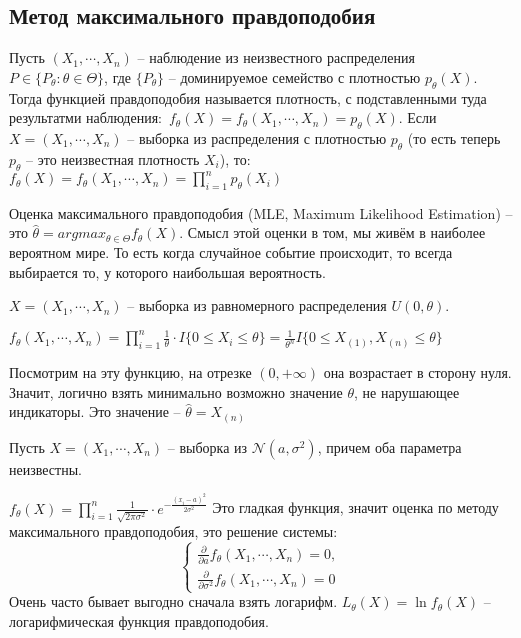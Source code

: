 \documentclass[document.tex]{subfiles}
\begin{document}
\subsection{Метод максимального правдоподобия}
\begin{definition}
    Пусть $(X_1, \cdots, X_n)$ -- наблюдение из неизвестного распределения $P \in \{P_{\theta}: \theta \in \Theta\}$,
    где $\{P_{\theta}\}$ -- доминируемое семейство с плотностью $p_{\theta}(X)$. Тогда функцией правдоподобия называется
    плотность, с подставленными туда результатми наблюдения:\
    $f_{\theta}(X) = f_{\theta}(X_1, \cdots, X_n) = p_{\theta}(X)$.
    Если $X = (X_1, \cdots, X_n)$ -- выборка из распределения с плотностью $p_{\theta}$ (то есть теперь $p_{\theta}$ --
    это неизвестная плотность $X_i$), то:
    $f_{\theta}(X) = f_{\theta}(X_1, \cdots, X_n) = \prod_{i = 1}^n p_{\theta}(X_i)$
\end{definition}

\begin{definition}
    Оценка максимального правдоподобия (MLE, Maximum Likelihood Estimation) -- это $\hat \theta = argmax_{\theta \in
    \Theta} f_{\theta}(X)$. Смысл этой оценки в том, мы живём в наиболее вероятном мире. То есть когда случайное событие
    происходит, то всегда выбирается то, у которого наибольшая вероятность.
\end{definition}

\begin{example}
    $X = (X_1, \cdots, X_n)$ -- выборка из равномерного распределения $U(0, \theta)$.

    $f_{\theta}(X_1, \cdots, X_n) = \prod_{i = 1}^n \frac{1}{\theta} \cdot I\{0 \leq X_i \leq \theta\} =
    \frac{1}{\theta^n}I\{0 \leq X_{(1)}, X_{(n)} \leq \theta\}$

    Посмотрим на эту функцию, на отрезке $(0, +\infty)$ она возрастает в сторону нуля. Значит, логично взять минимально
    возможно значение $\theta$, не нарушающее индикаторы. Это значение -- $\hat \theta = X_{(n)}$
\end{example}

\begin{example}
    Пусть $X = (X_1, \cdots, X_n)$ -- выборка из $\mathcal{N}(a, \sigma^2)$, причем оба параметра неизвестны.

    $f_{\theta}(X) = \prod_{i = 1}^n \frac{1}{\sqrt{2 \pi \sigma^2}} \cdot e^{- \frac{(x_i - a)^2}{2 \sigma^2}}$
    Это гладкая функция, значит оценка по методу максимального правдоподобия, это решение системы:
    \[
        \begin{cases}
            \frac{\partial}{\partial a}f_{\theta}(X_1, \cdots, X_n) = 0, \\
            \frac{\partial}{\partial \sigma^2} f_{\theta}(X_1, \cdots, X_n) = 0
        \end{cases}
    \]
    Очень часто бывает выгодно сначала взять логарифм. $L_{\theta}(X) = \ln f_{\theta}(X)$ -- логарифмическая функция
    правдоподобия.
\end{example}
\end{document}

